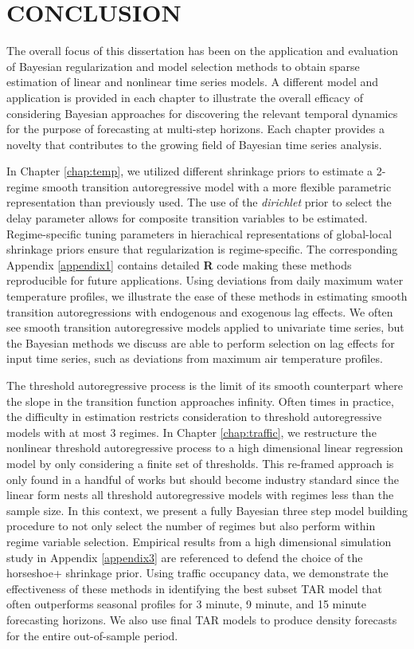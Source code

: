 \chapter{CONCLUSION}
The overall focus of this dissertation has been on the application and evaluation of Bayesian regularization and model selection methods to obtain sparse estimation of linear and nonlinear time series models. A different model and application is provided in each chapter to illustrate the overall efficacy of considering Bayesian approaches for discovering the relevant temporal dynamics for the purpose of forecasting at multi-step horizons. Each chapter provides a novelty that contributes to the growing field of Bayesian time series analysis. 

In Chapter \ref{chap:temp}, we utilized different shrinkage priors to estimate a 2-regime smooth transition autoregressive model with a more flexible parametric representation than previously used. The use of the \textit{dirichlet} prior to select the delay parameter allows for composite transition variables to be estimated. Regime-specific tuning parameters in hierachical representations of global-local shrinkage priors ensure that regularization is regime-specific. The corresponding Appendix \ref{appendix1} contains detailed \textbf{R} code making these methods reproducible for future applications. Using deviations from daily maximum water temperature profiles, we illustrate the ease of these methods in estimating smooth transition autoregressions with endogenous and exogenous lag effects. We often see smooth transition autoregressive models applied to univariate time series, but the Bayesian methods we discuss are able to perform selection on lag effects for input time series, such as deviations from maximum air temperature profiles.

The threshold autoregressive process is the limit of its smooth counterpart where the slope in the transition function approaches infinity. Often times in practice, the difficulty in estimation restricts consideration to threshold autoregressive models with at most 3 regimes. In Chapter \ref{chap:traffic},  we restructure the nonlinear threshold autoregressive process to a high dimensional linear regression model by only considering a finite set of thresholds. This re-framed approach is only found in a handful of works but should become industry standard since the linear form nests all threshold autoregressive models with regimes less than the sample size. In this context, we present a fully Bayesian three step model building procedure to not only select the number of regimes but also perform within regime variable selection. Empirical results from a high dimensional simulation study in Appendix \ref{appendix3} are referenced to defend the choice of the horseshoe+ shrinkage prior. Using traffic occupancy data, we demonstrate the effectiveness of these methods in identifying the best subset TAR model that often outperforms seasonal profiles for 3 minute, 9 minute, and 15 minute forecasting horizons. We also use final TAR models to produce density forecasts for the entire out-of-sample period. 

